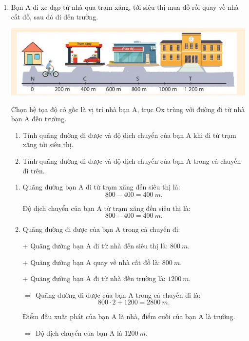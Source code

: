 \begin{enumerate}[label=\bfseries Bài \arabic*:]
	\item {}
	
	
	{
		Bạn A đi xe đạp từ nhà qua trạm xăng, tới siêu thị mua đồ rồi quay về nhà cất đồ, sau đó đi đến trường. 
		
		\begin{center}
			\includegraphics[scale=1]{../figs/VN10-2022-PH-TP004-4.jpg}
		\end{center}
		Chọn hệ tọa độ có gốc là vị trí nhà bạn A, trục Ox trùng với đường đi từ nhà bạn A đến trường. 
		\begin{enumerate}[label=\alph*)]
			\item Tính quãng đường đi được và độ dịch chuyển của bạn A khi đi từ trạm xăng tới siêu thị.
			\item Tính quãng đường đi được và độ dịch chuyển của bạn A trong cả chuyến đi trên.
		\end{enumerate}
	}
	
	\hideall
	{	
		\begin{enumerate}[label=\alph*)]
			\item Quãng đường bạn A đi từ trạm xăng đến siêu thị là: $$800 - 400 = \SI{400}{m}.$$
			
			Độ dịch chuyển của bạn A từ trạm xăng đến siêu thị là: $$800 - 400 = \SI{400}{m}.$$
			
			\item 
			Quãng đường đi được của bạn A trong cả chuyến đi:
			
			+ Quãng đường bạn A đi từ nhà đến siêu thị là: $\SI{800}{m}.$
			
			+ Quãng đường bạn A quay về nhà cất đồ là: $\SI{800}{m}.$
			
			+ Quãng đường bạn A đi từ nhà đến trường là: $\SI{1200}{m}.$
			
			$\Rightarrow$ Quãng đường đi được của bạn A trong cả chuyến đi là: 	$$ 800 \cdot 2 + 1200 = \SI{2800}{m}.$$ 
			
			Điểm đầu xuất phát của bạn A là nhà, điểm cuối của bạn A là trường.
			
			$\Rightarrow$ Độ dịch chuyển của bạn A là $\SI{1200}{m}.$
			

\end{enumerate}}
\end{enumerate}
